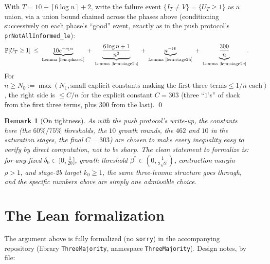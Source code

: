\documentclass[11pt]{article}
\newtheorem{remark}[theorem]{Remark}
\renewcommand{\Pr}{\mathbb{P}}
\newcommand{\ceil}[1]{\left\lceil #1 \right\rceil}
\begin{document}
With $T = 10 + \ceil{6\log n} + 2$, write the failure event $\{I_T \ne V\} =
\{U_T \ge 1\}$ as a union, via a union bound chained across the phases
above (conditioning successively on each phase's ``good'' event, exactly as
in the push protocol's \texttt{prNotAllInformed\_le}):
\[
  \Pr[U_T \ge 1] \;\le\; \underbrace{10 e^{-c_1 n}}_{\text{Lemma~\ref{lem:phase1}}}
  \;+\; \underbrace{\frac{6\log n + 1}{n^2}}_{\text{Lemma~\ref{lem:stage2a}}}
  \;+\; \underbrace{n^{-10}}_{\text{Lemma~\ref{lem:stage2b}}}
  \;+\; \underbrace{\frac{300}n}_{\text{Lemma~\ref{lem:stage2c}}}.
\]
For $n \ge N_0 := \max(N_1, \text{small explicit constants making the first
three terms} \le 1/n \text{ each})$, the right side is $\le C/n$ for the
explicit constant $C = 303$ (three ``$1$'s'' of slack from the first three
terms, plus $300$ from the last). \qed

\begin{remark}[On tightness]
As with the push protocol's write-up, the constants here (the $60\%/75\%$
thresholds, the $10$ growth rounds, the $462$ and $10$ in the saturation
stages, the final $C=303$) are chosen to make every inequality easy to
verify by direct computation, not to be sharp. The clean statement to
formalize is: \emph{for any fixed $\delta_0 \in (0,\tfrac1{20}]$, growth
threshold $\beta^\ast \in (0, \tfrac1{2\sqrt2})$, contraction margin
$\rho>1$, and stage-2b target $k_0 \ge 1$, the same three-lemma structure
goes through}, and the specific numbers above are simply one admissible
choice.
\end{remark}

\section{The Lean formalization}\label{sec:lean}

The argument above is fully formalized (no \texttt{sorry}) in the
accompanying repository (library \texttt{ThreeMajority}, namespace
\texttt{ThreeMajority}). Design notes, by file:
\end{document}

